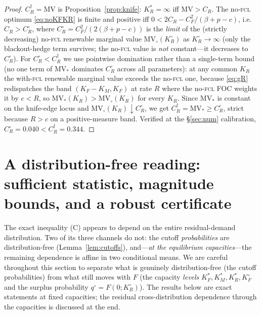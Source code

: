\documentclass[11pt,reqno]{amsart}
\theoremstyle{plain}
\theoremstyle{definition}
\theoremstyle{remark}
\newcommand{\KR}{K_R}
\newcommand{\KF}{K_F}
\newcommand{\KM}{K_M}
\newcommand{\KRs}{K_R^{*}}
\newcommand{\KFs}{K_F^{*}}
\newcommand{\KMs}{K_M^{*}}
\newcommand{\KRo}{K_R^{\circ}}
\newcommand{\KFo}{K_F^{\circ}}
\newcommand{\CF}{C_F}
\newcommand{\CR}{C_R}
\newcommand{\bp}{\beta+p}
\begin{document}
\begin{proof}
$\CR^{\dagger}=\mathrm{MV}$ is Proposition~\ref{prop:knife}: $\KRs=\infty$ iff
$\mathrm{MV}>\CR$. The no-\textsc{fcl} optimum \eqref{eq:noKFKR} is finite and
positive iff $0<2\CR-\CF^2/(\bp-c)$, i.e.\ $\CR>\CR^{\circ}$, where
$\CR^{\circ}=\CF^2/(2(\bp-c))$ is the \emph{limit} of the (strictly decreasing) no-\textsc{fcl}
renewable marginal value $\mathrm{MV}_{\!\circ}(\KRo)$ as $\KRo\to\infty$ (only the
blackout-hedge term survives; the no-\textsc{fcl} value is \emph{not} constant---it
decreases to $\CR^{\circ}$). For $\CR^{\circ}<\CR^{\dagger}$ we use pointwise domination
rather than a single-term bound (no one term of $\mathrm{MV}_{\!*}$ dominates $\CR^{\circ}$
across all parameters): at any common $\KR$ the with-\textsc{fcl} renewable marginal value
exceeds the no-\textsc{fcl} one, because \eqref{eq:gR} redispatches the band
$(\KF-\KM,\KF)$ at rate $R$ where the no-\textsc{fcl} FOC weights it by $c<R$, so
$\mathrm{MV}_{\!*}(\KR)>\mathrm{MV}_{\!\circ}(\KR)$ for every $\KR$. Since $\mathrm{MV}_{\!*}$
is constant on the knife-edge locus and $\mathrm{MV}_{\!\circ}(\KR)\downarrow\CR^{\circ}$, we
get $\CR^{\dagger}=\mathrm{MV}_{\!*}\ge\CR^{\circ}$, strict because $R>c$ on a
positive-measure band. Verified at the \S\ref{sec:num} calibration,
$\CR^{\circ}=0.040<\CR^{\dagger}=0.344$.
\end{proof}

\section{A distribution-free reading: sufficient statistic, magnitude bounds, and a robust certificate}\label{sec:robustcarbon}

The exact inequality (C) appears to depend on the entire residual-demand
distribution. Two of its three channels do not: the cutoff \emph{probabilities}
are distribution-free (Lemma~\ref{lem:cutoffs}), and---\emph{at the equilibrium
capacities}---the remaining dependence is affine in two conditional means. We are
careful throughout this section to separate what is genuinely distribution-free
(the cutoff probabilities) from what still moves with $F$ (the capacity
\emph{levels} $\KFs,\KMs,\KRs,\KFo$ and the surplus probability
$q^{\circ}=F(0;\KRo)$). The results below are exact statements at fixed
capacities; the residual cross-distribution dependence through the capacities is
discussed at the end.
\end{document}
